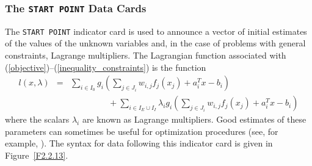 \documentclass[a4paper]{article}
\newcommand{\req}[1]{(\ref{#1})}
\newcommand{\ms}{\;\;\;\;}
\begin{document}
\subsubsection{\label{S2.2.13}The {\tt START POINT} Data Cards}

The {\tt START POINT}
indicator  card
is used to announce a vector of initial estimates of the values of the
unknown variables and, in the case of problems with general
constraints, Lagrange multipliers.
The   Lagrangian
function     associated    with
\req{objective}--\req{inequality_constraints} is the function
\begin{eqnarray*}
l(x,\lambda) & = &
\sum_{i \in I_{0}}
        g_i\left(  \sum_{j \in J_i} w_{i,j} f_j (x_j) + a_i^T x - b_i \right)\\
& & \ms \ms \ms \ms + \sum_{i \in I_E \cup I_I}
\lambda_i g_i\left( \sum_{j \in J_i} w_{i,j} f_j (x_j) + a_i^T x - b_i \right)
\end{eqnarray*}
where the scalars $\lambda_i$ are known as Lagrange multipliers.
Good  estimates  of these  parameters  can   sometimes be  useful  for
optimization procedures  (see, for example,    \cite{GillMurrWrig81}).
The  syntax  for  data  following   this  indicator card
is  given in Figure~\ref{F2.2.13}.
\end{document}
